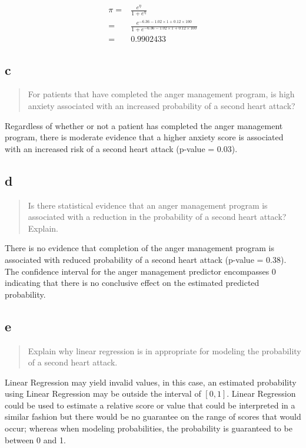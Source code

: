 \documentclass[11pt]{article}
\begin{document}
\begin{equation}
\begin{split}
\pi = & \frac{e^\eta}{1 + e^\eta}\\
= & \frac{e^{-6.36 - 1.02 \times 1 + 0.12 \times 100}}{1 + e^{-6.36 - 1.02 \times 1 + 0.12 \times 100}}\\
= & 0.9902433
\end{split}
\end{equation}


\subsection{c}
\label{sec:orgfd5ff17}
\begin{quote}
For patients that have completed the anger management program, is high anxiety
associated with an increased probability of a second heart attack?
\end{quote}

Regardless of whether or not a patient has completed the anger management
program, there is moderate evidence that a higher anxiety score is associated with an
increased risk of a second heart attack (p-value = 0.03).

\subsection{d}
\label{sec:orgd3950f7}
\begin{quote}
Is there statistical evidence that an anger management program is associated
with a reduction in the probability of a second heart attack? Explain.
\end{quote}

There is no evidence that completion of the anger management program is
associated with reduced probability of a second heart attack (p-value = 0.38).
The confidence interval for the anger management predictor encompasses 0
indicating that there is no conclusive effect on the estimated predicted probability.

\subsection{e}
\label{sec:org6bae1fd}
\begin{quote}
Explain why linear regression is in appropriate for modeling the probability of
a second heart attack.
\end{quote}

Linear Regression may yield invalid values, in this case, an estimated
probability using Linear Regression may be outside the interval of \([0,1]\).
Linear Regression could be used to estimate a relative score or value that could
be interpreted in a similar fashion but there would be no guarantee on the range
of scores that would occur; whereas when modeling probabilities, the probability
is guaranteed to be between 0 and 1.
\end{document}
